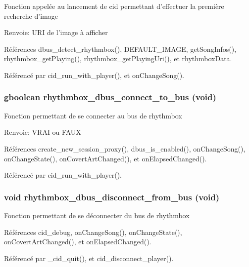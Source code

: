 Fonction appelée au lancement de cid permettant d'effectuer la première recherche d'image \begin{Desc}
\item[Renvoie:]URI de l'image à afficher \end{Desc}


Références dbus\_\-detect\_\-rhythmbox(), DEFAULT\_\-IMAGE, getSongInfos(), rhythmbox\_\-getPlaying(), rhythmbox\_\-getPlayingUri(), et rhythmboxData.

Référencé par cid\_\-run\_\-with\_\-player(), et onChangeSong().
\subsubsection{\setlength{\rightskip}{0pt plus 5cm}gboolean rhythmbox\_\-dbus\_\-connect\_\-to\_\-bus (void)}\label{cid-rhythmbox_8h_a6a66092538332b34ee5acc530e856f4}


Fonction permettant de se connecter au bus de rhythmbox \begin{Desc}
\item[Renvoie:]VRAI ou FAUX \end{Desc}


Références create\_\-new\_\-session\_\-proxy(), dbus\_\-is\_\-enabled(), onChangeSong(), onChangeState(), onCovertArtChanged(), et onElapsedChanged().

Référencé par cid\_\-run\_\-with\_\-player().
\subsubsection{\setlength{\rightskip}{0pt plus 5cm}void rhythmbox\_\-dbus\_\-disconnect\_\-from\_\-bus (void)}\label{cid-rhythmbox_8h_c9ca0699d0cbcad34db859ae52f84a23}


Fonction permettant de se déconnecter du bus de rhythmbox 

Références cid\_\-debug, onChangeSong(), onChangeState(), onCovertArtChanged(), et onElapsedChanged().

Référencé par \_\-cid\_\-quit(), et cid\_\-disconnect\_\-player().
